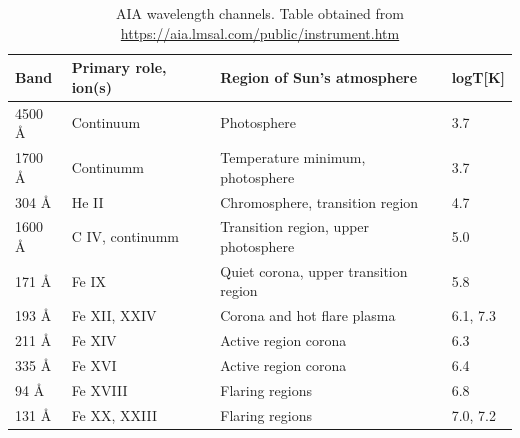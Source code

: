 \begin{table}[h!]
    \centering
      \setlength{\tabcolsep}{10pt}
      \renewcommand{\arraystretch}{1.5}
    \begin{tabular}{| l | l | l | l |}
      \hline
       \textbf{Band} & \textbf{Primary role, ion(s)} & \textbf{Region of Sun's atmosphere} & \textbf{logT{[}K{]}} \\
      \hline
      4500 Å & Continuum            & Photosphere                                            & 3.7                                   \\
      \hline
      1700 Å & Continumm            & Temperature minimum, photosphere                       & 3.7                                   \\
      \hline
      304 Å  & He II                & Chromosphere, transition region                        & 4.7                                   \\
      \hline
      1600 Å & C IV, continumm      & Transition region, upper photosphere                   & 5.0                                   \\
      \hline
      171 Å  & Fe IX                & Quiet corona, upper transition region                  & 5.8                                   \\
      \hline
      193 Å  & Fe XII, XXIV         & Corona and hot flare plasma                            & 6.1, 7.3                              \\
      \hline
      211 Å  & Fe XIV               & Active region corona                                   & 6.3                                   \\
      \hline
      335 Å  & Fe XVI               & Active region corona                                   & 6.4                                   \\
      \hline
      94 Å   & Fe XVIII             & Flaring regions                                        & 6.8                                   \\
      \hline
      131 Å  & Fe XX, XXIII         & Flaring regions                                        & 7.0, 7.2                              \\
      \hline
    \end{tabular}
    \caption{AIA wavelength channels. Table obtained from \url{https://aia.lmsal.com/public/instrument.htm}}
    \label{tab:aia_wav_channels}
\end{table}

